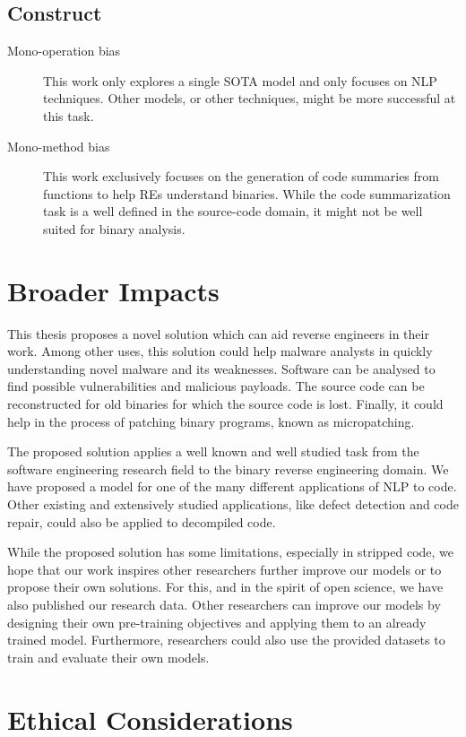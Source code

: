 \subsection{Construct}
    \begin{description}
        \item[Mono-operation bias] This work only explores a single SOTA model and only focuses on NLP techniques. Other models, or other techniques, might be more successful at this task.
        \item[Mono-method bias] This work exclusively focuses on the generation of code summaries from functions to help REs understand binaries. While the code summarization task is a well defined in the source-code domain, it might not be well suited for binary analysis.
    \end{description}


\section{Broader Impacts}
This thesis proposes a novel solution which can aid reverse engineers in their work. Among other uses, this solution could help malware analysts in quickly understanding novel malware and its weaknesses. Software can be analysed to find possible vulnerabilities and malicious payloads. The source code can be reconstructed for old binaries for which the source code is lost. Finally, it could help in the process of patching binary programs, known as micropatching.

The proposed solution applies a well known and well studied task from the software engineering research field to the binary reverse engineering domain. We have proposed a model for one of the many different applications of NLP to code. Other existing and extensively studied applications, like defect detection and code repair, could also be applied to decompiled code. 

While the proposed solution has some limitations, especially in stripped code, we hope that our work inspires other researchers further improve our models or to propose their own solutions. For this, and in the spirit of open science, we have also published our research data. Other researchers can improve our models by designing their own pre-training objectives and applying them to an already trained model. Furthermore, researchers could also use the provided datasets to train and evaluate their own models.



\section{Ethical Considerations}
